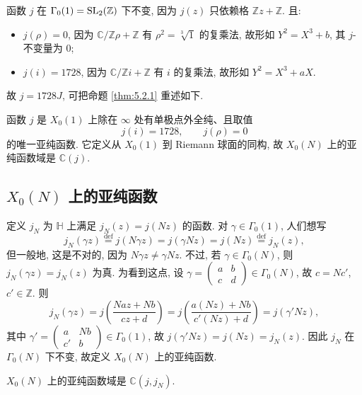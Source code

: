 函数 $j$ 在 $\Gamma_0(1) = \operatorname{SL}_2(\mathbb{Z})$ 下不变, 因为 $j(z)$ 只依赖格 $\mathbb{Z}z + \mathbb{Z}$. 且:
\begin{itemize}
\item $j(\rho) = 0$, 因为 $\mathbb{C}/\mathbb{Z}\rho + \mathbb{Z}$ 有 $\rho^2 = \sqrt[3]{1}$ 的复乘法, 故形如 $Y^2 = X^3 + b$, 其 $j$-不变量为 $0$;
\item $j(i) = 1728$, 因为 $\mathbb{C}/\mathbb{Z}i + \mathbb{Z}$ 有 $i$ 的复乘法, 故形如 $Y^2 = X^3 + aX$.
\end{itemize}
故 $j = 1728J$, 可把命题 \ref{thm:5.2.1} 重述如下.

\begin{proposition} \label{thm:5.2.2} 
函数 $j$ 是 $X_0(1)$ 上除在 $\infty$ 处有单极点外全纯、且取值
\[
j(i) = 1728, \qquad j(\rho) = 0
\]
的唯一亚纯函数. 它定义从 $X_0(1)$ 到 Riemann 球面的同构, 故 $X_0(N)$ 上的亚纯函数域是 $\mathbb{C}(j)$.
\end{proposition}

\subsection*{$X_0(N)$ 上的亚纯函数}

定义 $j_N$ 为 $\mathbb{H}$ 上满足 $j_N(z) = j(Nz)$ 的函数. 对 $\gamma\in\Gamma_0(1)$, 人们想写
\[
j_N(\gamma z) \overset{\text{def}}{=} j(N\gamma z) = j(\gamma Nz) = j(Nz) \overset{\text{def}}{=} j_N(z),
\]
但一般地, 这是不对的, 因为 $N\gamma z\neq\gamma Nz$. 不过, 若 $\gamma\in\Gamma_0(N)$, 则 $j_N(\gamma z) = j_N(z)$ 为真. 为看到这点, 设 $\gamma = \begin{pmatrix}a & b\\ c & d\end{pmatrix}\in\Gamma_0(N)$, 故 $c = Nc'$, $c'\in\mathbb{Z}$. 则
\[
j_N(\gamma z) = j\left(\frac{Naz + Nb}{cz + d}\right) = j\left(\frac{a(Nz) + Nb}{c'(Nz) + d}\right) = j(\gamma' Nz),
\]
其中 $\gamma' = \begin{pmatrix}a & Nb\\ c' & b\end{pmatrix}\in\Gamma_0(1)$, 故 $j(\gamma' Nz) = j(Nz) = j_N(z)$. 因此 $j_N$ 在 $\Gamma_0(N)$ 下不变, 故定义 $X_0(N)$ 上的亚纯函数.

\begin{theorem} \label{thm:5.2.3} 
$X_0(N)$ 上的亚纯函数域是 $\mathbb{C}(j, j_N)$.
\end{theorem}


